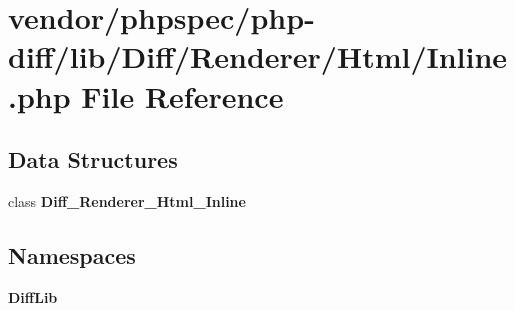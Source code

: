 \section{vendor/phpspec/php-\/diff/lib/\+Diff/\+Renderer/\+Html/\+Inline.php File Reference}
\label{phpspec_2php-diff_2lib_2_diff_2_renderer_2_html_2_inline_8php}
\subsection*{Data Structures}
\begin{DoxyCompactItemize}
\item 
class {\bf Diff\+\_\+\+Renderer\+\_\+\+Html\+\_\+\+Inline}
\end{DoxyCompactItemize}
\subsection*{Namespaces}
\begin{DoxyCompactItemize}
\item 
 {\bf Diff\+Lib}
\end{DoxyCompactItemize}
